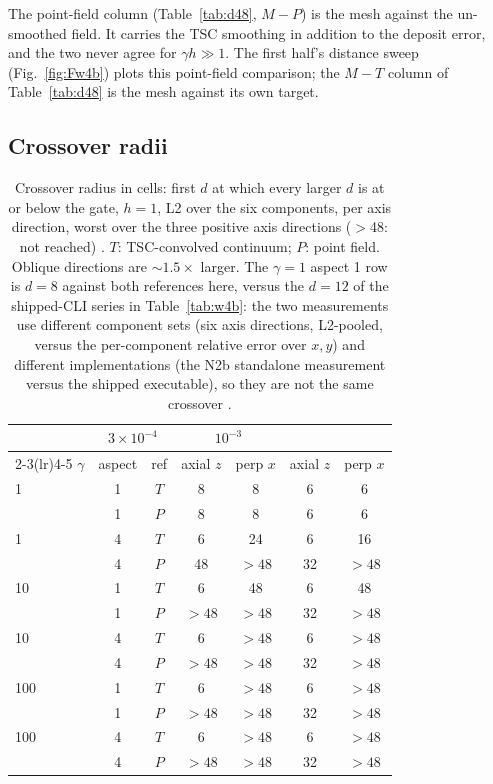 The point-field column (Table~\ref{tab:d48}, $M\!-\!P$) is the mesh against
the un-smoothed field. It carries the TSC smoothing in addition to the deposit
error, and the two never agree for $\gamma h \gg 1$. The first half's distance
sweep (Fig.~\ref{fig:Fw4b}) plots this point-field comparison; the
$M\!-\!T$ column of Table~\ref{tab:d48} is the mesh against its own target.

\subsection{Crossover radii}

\begin{table}[t]
\centering
\small
\caption{Crossover radius in cells: first $d$ at which every larger $d$ is at
or below the gate, $h=1$, L2 over the six components, per axis direction,
worst over the three positive axis directions ($>$48: not reached)
\citep{N2b}. $T$: TSC-convolved continuum; $P$: point field. Oblique
directions are $\sim1.5\times$ larger. The $\gamma=1$ aspect 1 row is $d=8$
against both references here, versus the $d=12$ of the shipped-CLI series in
Table~\ref{tab:w4b}: the two measurements use different component sets (six
axis directions, L2-pooled, versus the per-component relative error over
$x,y$) and different implementations (the N2b standalone measurement versus
the shipped executable), so they are not the same crossover
\citep{N2b,W4b}.}
\label{tab:crossover}
\begin{tabular}{lcc|cc|cc}
\toprule
 & \multicolumn{2}{c}{$3\!\times\!10^{-4}$} & \multicolumn{2}{c}{$10^{-3}$} \\
\cmidrule(lr){2-3}\cmidrule(lr){4-5}
$\gamma$ & aspect & ref & axial $z$ & perp $x$ & axial $z$ & perp $x$ \\
\midrule
1   & 1 & $T$ & 8  & 8  & 6  & 6  \\
    & 1 & $P$ & 8  & 8  & 6  & 6  \\
1   & 4 & $T$ & 6  & 24 & 6  & 16 \\
    & 4 & $P$ & 48 & $>48$ & 32 & $>48$ \\
10  & 1 & $T$ & 6  & 48 & 6  & 48 \\
    & 1 & $P$ & $>48$ & $>48$ & 32 & $>48$ \\
10  & 4 & $T$ & 6  & $>48$ & 6  & $>48$ \\
    & 4 & $P$ & $>48$ & $>48$ & 32 & $>48$ \\
100 & 1 & $T$ & 6  & $>48$ & 6  & $>48$ \\
    & 1 & $P$ & $>48$ & $>48$ & 32 & $>48$ \\
100 & 4 & $T$ & 6  & $>48$ & 6  & $>48$ \\
    & 4 & $P$ & $>48$ & $>48$ & 32 & $>48$ \\
\bottomrule
\end{tabular}
\end{table}

